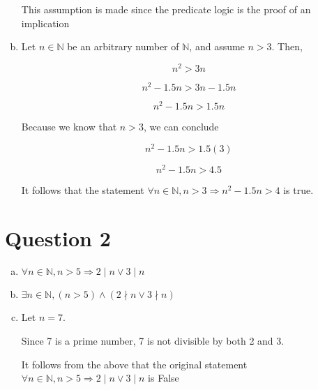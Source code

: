 \documentclass[12pt]{article}
\begin{document}
\begin{enumerate}[a.]
    This assumption is made since the predicate logic is the proof of an implication

    \item

    Let $n \in \mathbb{N}$ be an arbitrary number of $\mathbb{N}$, and assume $n > 3$. Then,

    \setcounter{equation}{0}
    \begin{equation}
        n^2 > 3n
    \end{equation}

    \begin{equation}
        n^2 -1.5n > 3n - 1.5n
    \end{equation}

    \begin{equation}
        n^2 -1.5n > 1.5n
    \end{equation}

    Because we know that $n > 3$, we can conclude

    \begin{equation}
        n^2 -1.5n > 1.5(3)
    \end{equation}

    \begin{equation}
        n^2 -1.5n > 4.5
    \end{equation}

    It follows that the statement $\forall n \in \mathbb{N}, n > 3 \Rightarrow n^2 - 1.5n > 4$ is true.

\end{enumerate}

\section*{Question 2}
\begin{enumerate}[a.]
    \item $\forall n \in \mathbb{N}, n > 5 \Rightarrow 2 \mid n \lor 3 \mid n$
    \item $\exists n \in \mathbb{N}, (n > 5) \land (2 \nmid n \lor 3 \nmid n)$
    \item

    Let $n = 7$.

    Since 7 is a prime number, 7 is not divisible by both 2 and 3.

    It follows from the above that the original statement $\forall n \in \mathbb{N}, n > 5 \Rightarrow 2 \mid n \lor 3 \mid n$ is False
\end{enumerate}
\end{document}
